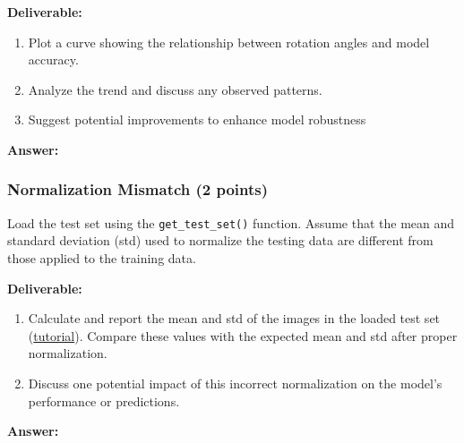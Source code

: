 \documentclass[11pt, oneside]{article}   	%
\begin{document}
\noindent\textbf{Deliverable:}

\begin{enumerate}
    \item Plot a curve showing the relationship between rotation angles and model accuracy.
    \item Analyze the trend and discuss any observed patterns.
    \item Suggest potential improvements to enhance model robustness
\end{enumerate}



\textbf{Answer:} \\


\subsubsection*{Normalization Mismatch (2 points)}

Load the test set using the \texttt{get\_test\_set()} function. Assume that the mean and standard deviation (std) used to normalize the testing data are different from those applied to the training data.

\noindent\textbf{Deliverable:}

\begin{enumerate} \item Calculate and report the mean and std of the images in the loaded test set (\href{https://stackoverflow.com/questions/73350133/how-to-calculate-mean-and-standard-deviation-of-a-set-of-images}{tutorial}). Compare these values with the expected mean and std after proper normalization.

\item Discuss one potential impact of this incorrect normalization on the model's performance or predictions. 

\end{enumerate}
\textbf{Answer:} 
\end{document}
